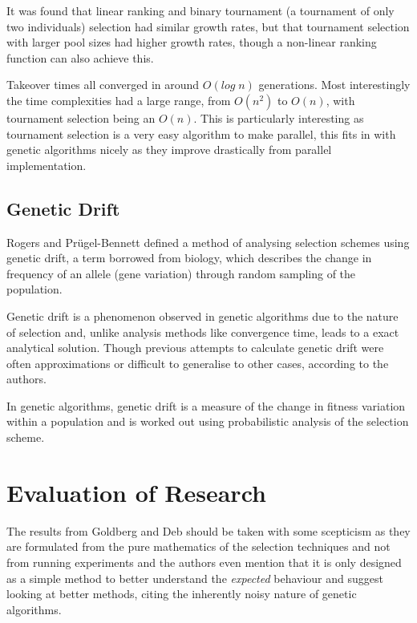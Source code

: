 \documentclass[10pt, a4paper]{article}
\begin{document}
It was found that linear ranking and binary tournament (a tournament of only
two individuals) selection had similar growth rates, but that tournament 
selection with larger pool sizes had higher growth rates, though a non-linear
ranking function can also achieve this.

Takeover times all converged in around $O(log\;n)$ generations. Most 
interestingly the time complexities had a large range, from $O(n^2)$ to $O(n)$,
with tournament selection being an $O(n)$. This is particularly interesting as
tournament selection is a very easy algorithm to make parallel, this fits in
with genetic algorithms nicely as they improve drastically from parallel 
implementation.


\subsection{Genetic Drift}
Rogers and Pr\"{u}gel-Bennett\cite{Rogers1999Genetic} defined a method of 
analysing selection schemes using genetic drift, a term borrowed from biology,
which describes the change in frequency of an allele (gene variation) through
random sampling of the population.

Genetic drift is a phenomenon observed in genetic algorithms due to the nature
of selection and, unlike analysis methods like convergence time, leads to a
exact analytical solution. Though previous attempts to calculate genetic drift
were often approximations or difficult to generalise to other cases, according
to the authors.

In genetic algorithms, genetic drift is a measure of the change in fitness
variation within a population and is worked out using probabilistic analysis of
the selection scheme. 



\newpage
\section{Evaluation of Research}

The results from Goldberg and Deb\cite{Goldberg1991Comparative} should be taken
with some scepticism as they are formulated from the pure mathematics of the 
selection techniques and not from running experiments and the authors even 
mention that it is only designed as a simple method to better understand the 
\textit{expected} behaviour and suggest looking at better methods, citing the 
inherently noisy nature of genetic algorithms.
\end{document}
